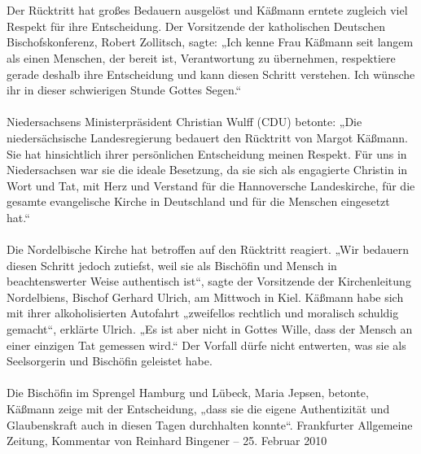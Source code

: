 \documentclass[a4paper,12pt,twoside]{scrbook}
\begin{document}
\\\\
Der Rücktritt hat großes Bedauern ausgelöst und Käßmann erntete zugleich viel Respekt für ihre Entscheidung. Der Vorsitzende der katholischen Deutschen Bischofskonferenz, Robert Zollitsch, sagte: „Ich kenne Frau Käßmann seit langem als einen Menschen, der bereit ist, Verantwortung zu übernehmen, respektiere gerade deshalb ihre Entscheidung und kann diesen Schritt verstehen. Ich wünsche ihr in dieser schwierigen Stunde Gottes Segen.“
\\\\
Niedersachsens Ministerpräsident Christian Wulff (CDU) betonte: „Die niedersächsische Landesregierung bedauert den Rücktritt von Margot Käßmann. Sie hat hinsichtlich ihrer persönlichen Entscheidung meinen Respekt. Für uns in Niedersachsen war sie die ideale Besetzung, da sie sich als engagierte Christin in Wort und Tat, mit Herz und Verstand für die Hannoversche Landeskirche, für die gesamte evangelische Kirche in Deutschland und für die Menschen eingesetzt hat.“
\\\\
Die Nordelbische Kirche hat betroffen auf den Rücktritt reagiert. „Wir bedauern diesen Schritt jedoch zutiefst, weil sie als Bischöfin und Mensch in beachtenswerter Weise authentisch ist“, sagte der Vorsitzende der Kirchenleitung Nordelbiens, Bischof Gerhard Ulrich, am Mittwoch in Kiel. Käßmann habe sich mit ihrer alkoholisierten Autofahrt „zweifellos rechtlich und moralisch schuldig gemacht“, erklärte Ulrich. „Es ist aber nicht in Gottes Wille, dass der Mensch an einer einzigen Tat gemessen wird.“ Der Vorfall dürfe nicht entwerten, was sie als Seelsorgerin und Bischöfin geleistet habe.
\\\\
Die Bischöfin im Sprengel Hamburg und Lübeck, Maria Jepsen, betonte, Käßmann zeige mit der Entscheidung, „dass sie die eigene Authentizität und Glaubenskraft auch in diesen Tagen durchhalten konnte“.
\newpage
Frankfurter Allgemeine Zeitung, Kommentar von Reinhard Bingener \hfill -- \hfill 25. Februar 2010
\end{document}
